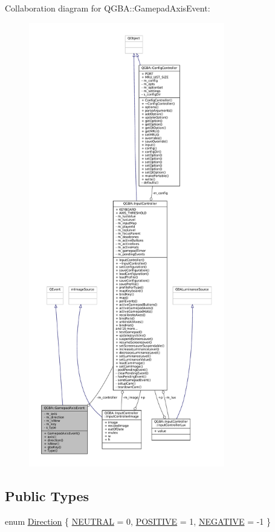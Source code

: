 Collaboration diagram for Q\+G\+BA\+:\+:Gamepad\+Axis\+Event\+:
\nopagebreak
\begin{figure}[H]
\begin{center}
\leavevmode
\includegraphics[height=550pt]{class_q_g_b_a_1_1_gamepad_axis_event__coll__graph}
\end{center}
\end{figure}
\subsection*{Public Types}
\begin{DoxyCompactItemize}
\item 
enum \mbox{\hyperlink{class_q_g_b_a_1_1_gamepad_axis_event_a5d50ab74dce4e58252f2affb5f227bbc}{Direction}} \{ \mbox{\hyperlink{class_q_g_b_a_1_1_gamepad_axis_event_a5d50ab74dce4e58252f2affb5f227bbca248f1cf1b3465e4938c933151d73dbb7}{N\+E\+U\+T\+R\+AL}} = 0, 
\mbox{\hyperlink{class_q_g_b_a_1_1_gamepad_axis_event_a5d50ab74dce4e58252f2affb5f227bbca3cf6db120d70ddabbb30659b3b8a3786}{P\+O\+S\+I\+T\+I\+VE}} = 1, 
\mbox{\hyperlink{class_q_g_b_a_1_1_gamepad_axis_event_a5d50ab74dce4e58252f2affb5f227bbcac7cd0539bb324b87a2e98b28efbed776}{N\+E\+G\+A\+T\+I\+VE}} = -\/1
 \}
\end{DoxyCompactItemize}
